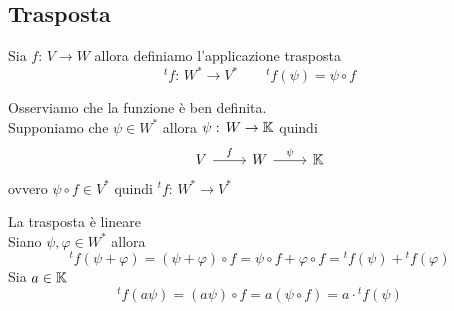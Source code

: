 \subsection{Trasposta}
\begin{defn}\bianco
Sia $f:\, V \to W $ allora definiamo l'applicazione trasposta
$${}^t f:\, W^*\to V^* \qquad  {}^t f(\psi)=\psi \circ f  $$
\end{defn}
\begin{oss}Osserviamo che la funzione \`e ben definita.\\
Supponiamo che $\psi \in W^*$ allora $\psi:\, W \to \mathbb{K} $ quindi
$$\begin{tikzcd}
V
\arrow[r,"f"]
&W 
\arrow{r}{\psi}
&\K
\end{tikzcd}$$
ovvero $\psi \circ f \in V^* $ quindi ${}^tf:\, W^* \to V^*$
\end{oss}
\begin{prop}La trasposta \`e lineare\\
Siano $\psi , \varphi \in W^* $ allora
$$ {}^t f( \psi + \varphi ) = (\psi + \varphi ) \circ f = \psi \circ f + \varphi \circ f =  {}^t f( \psi ) +  {}^t f( \varphi)  $$
Sia $a \in \mathbb{K} $ 
$$  {}^t f(a \psi ) =(a\psi ) \circ f = a(\psi \circ f ) =  a \cdot {}^t f( \psi )$$
\endproof
\end{prop}
